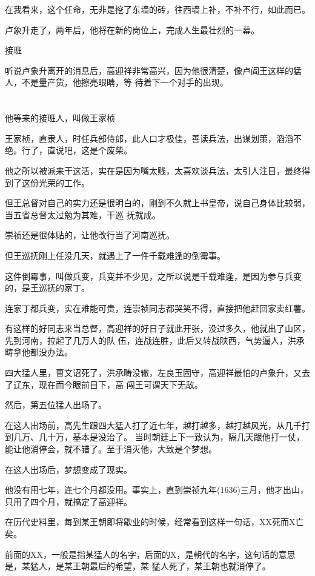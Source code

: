 \documentclass[11pt,a4paper,onecolumn]{article}
\begin{document}
在我看来，这个任命，无非是挖了东墙的砖，往西墙上补，不补不行，如此而已。

卢象升走了，两年后，他将在新的岗位上，完成人生最壮烈的一幕。

接班

听说卢象升离开的消息后，高迎祥非常高兴，因为他很清楚，像卢阎王这样的猛人，不是量产货，他擦亮眼睛，等
待着下一个对手的出现。

\section[\thesection]{}

他等来的接班人，叫做王家桢

王家桢，直隶人，时任兵部侍郎，此人口才极佳，善读兵法，出谋划策，滔滔不绝。行了，直说吧，这是个废柴。

他之所以被派来干这活，实在是因为嘴太贱，太喜欢谈兵法，太引人注目，最终得到了这份光荣的工作。

但王总督对自己的实力还是很明白的，刚到不久就上书皇帝，说自己身体比较弱，当五省总督太过勉为其难，干巡
抚就成。

崇祯还是很体贴的，让他改行当了河南巡抚。

但王巡抚刚上任没几天，就遇上了一件千载难逢的倒霉事。

这件倒霉事，叫做兵变，兵变并不少见，之所以说是千载难逢，是因为参与兵变的，是王巡抚的家丁。

连家丁都兵变，实在难能可贵，连崇祯同志都哭笑不得，直接把他赶回家卖红薯。

有这样的好同志来当总督，高迎祥的好日子就此开张，没过多久，他就出了山区，先到河南，拉起了几万人的队
伍，连战连胜，此后又转战陕西，气势逼人，洪承畴拿他都没办法。

四大猛人里，曹文诏死了，洪承畴没辙，左良玉固守，高迎祥最怕的卢象升，又去了辽东，现在而今眼前目下，高
闯王可谓天下无敌。

然后，第五位猛人出场了。

在这人出场前，高先生跟四大猛人打了近七年，越打越多，越打越风光，从几千打到几万、几十万，基本是没治了。
当时朝廷上下一致认为，隔几天跟他打一仗，能让他消停会，就不错了。至于消灭他，大致是个梦想。

在这人出场后，梦想变成了现实。

他没有用七年，连七个月都没用。事实上，直到崇祯九年(1636)三月，他才出山，只用了四个月，就搞定了高迎祥。

在历代史料里，每到某王朝即将歇业的时候，经常看到这样一句话，XX死而X亡矣。

前面的XX，一般是指某猛人的名字，后面的X，是朝代的名字，这句话的意思是，某猛人，是某王朝最后的希望，某
猛人死了，某王朝也就消停了。
\end{document}
